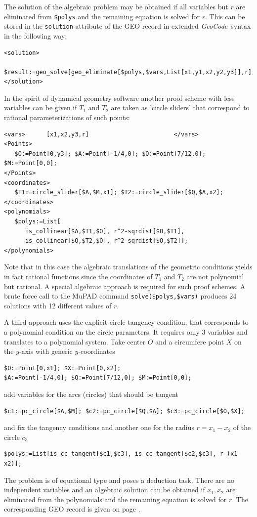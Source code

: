 \documentclass[11pt]{article}
\newcommand{\GC}{\textit{Geo\-Code}}
\begin{document}
The solution of the algebraic problem may be obtained if all variables but $r$
are eliminated from {\tt \$polys} and the remaining equation is solved for
$r$.  This can be stored in the {\tt solution} attribute of the GEO record in
extended \GC\ syntax in the following way:
\begin{verbatim}
<solution>
   $result:=geo_solve[geo_eliminate[$polys,$vars,List[x1,y1,x2,y2,y3]],r];
</solution>
\end{verbatim}%

In the spirit of dynamical geometry software another proof scheme with less
variables can be given if $T_1$ and $T_2$ are taken as 'circle sliders' that
correspond to rational parameterizations of such points:
\begin{verbatim}
<vars>      [x1,x2,y3,r]                        </vars>
<Points>
   $O:=Point[0,y3]; $A:=Point[-1/4,0]; $Q:=Point[7/12,0]; $M:=Point[0,0];
</Points>
<coordinates> 
   $T1:=circle_slider[$A,$M,x1]; $T2:=circle_slider[$Q,$A,x2];
</coordinates>
<polynomials>
   $polys:=List[
      is_collinear[$A,$T1,$O], r^2-sqrdist[$O,$T1], 
      is_collinear[$Q,$T2,$O], r^2-sqrdist[$O,$T2]];
</polynomials>
\end{verbatim}%
Note that in this case the algebraic translations of the geometric
conditions yields in fact rational functions since the coordinates of
$T_1$ and $T_2$ are not polynomial but rational.  A special algebraic
approach is required for such proof schemes. A brute force call to the
MuPAD command {\tt solve(\$polys,\$vars)} produces 24 solutions with
12 different values of $r$.

A third approach uses the explicit circle tangency condition, that corresponds
to a polynomial condition on the circle parameters.  It requires only 3
variables and translates to a polynomial system. Take center $O$ and a
circumfere point $X$ on the $y$-axis with generic $y$-coordinates
\begin{verbatim}
$O:=Point[0,x1]; $X:=Point[0,x2]; 
$A:=Point[-1/4,0]; $Q:=Point[7/12,0]; $M:=Point[0,0];
\end{verbatim}
add variables for the arcs (circles) that should be tangent
\begin{verbatim}
$c1:=pc_circle[$A,$M]; $c2:=pc_circle[$Q,$A]; $c3:=pc_circle[$O,$X];
\end{verbatim}
and fix the tangency conditions and another one for the radius $r=x_1-x_2$ of
the circle $c_3$
\begin{verbatim}
$polys:=List[is_cc_tangent[$c1,$c3], is_cc_tangent[$c2,$c3], r-(x1-x2)];
\end{verbatim}%
The problem is of equational type and poses a deduction task.  There are no
independent variables and an algebraic solution can be obtained if $x_1,x_2$
are eliminated from the polynomials and the remaining equation is solved for
$r$.  The corresponding GEO record is given on page \pageref{table:3}.
\end{document}
